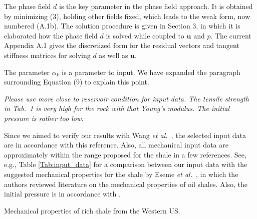 \documentclass{elsarticle}
\newcommand{\review}[1]{ \textit{#1}}
\begin{document}
{The phase field $d$ is the key parameter in the phase field approach. It is obtained by minimizing (3), holding other fields fixed, which leads to the weak form, now numbered (A.1b). The solution procedure is given in Section 3, in which it is elaborated how the phase field $d$ is solved while coupled to $\bm{u}$ and $p$. The current Appendix A.1 gives the discretized form for the residual vectors and tangent stiffness matrices for solving $d$ as well as $\bm{u}$.

The parameter $\alpha_k$ is a parameter to input. We have expanded the paragraph surrounding Equation (9) to explain this point.


\bigskip

    \review{Please use more close to reservoir condition for input data. The tensile strength in Tab.~1 is very high for the rock with that Young's modulus. The initial pressure is rather too low.}


{Since we aimed to verify our results with Wang \emph{et al.}~\cite{wang2018influence}, the selected input data are in accordance with this reference. Also, all mechanical input data are approximately within the range proposed for the shale in a few references. See, e.g., Table \ref{Tab:input_data} for a comparison between our input data with the suggested mechanical properties for the shale by Eseme \emph{et al.}~\cite{eseme2007review}, in which the authors %
	reviewed literature on the mechanical properties of oil shales. Also, the initial pressure is in accordance with \cite{wang2018influence}. %
}

\begin{table}[htbp]
	\centering
	\caption{Mechanical properties of rich shale from the Western US.}
	

\end{table}}
\end{document}

